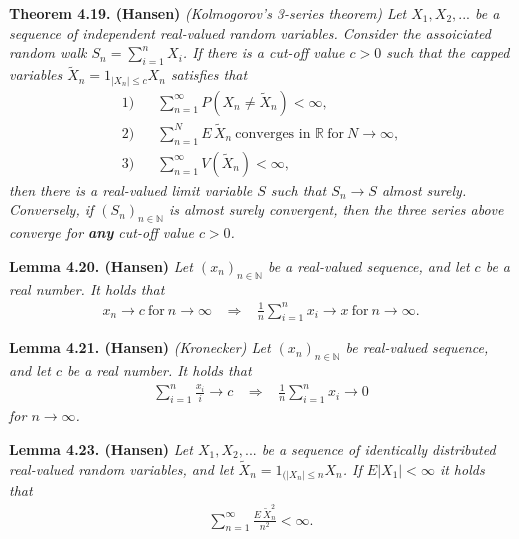 \documentclass[a4paper,12pt,openany]{book}
\begin{document}
\textbf{Theorem 4.19. (Hansen)} \emph{(Kolmogorov's 3-series theorem) Let \(X_1,X_2,...\) be a sequence of independent real-valued random variables. Consider the assoiciated random walk \(S_n=\sum_{i=1}^n X_i\). If there is a cut-off value \(c>0\) such that the capped variables \(\tilde{X}_n=1_{\vert X_n\vert \le c}X_n\) satisfies that}
\begin{align*}
    \text{1)}\hspace{10pt}& \sum_{n=1}^\infty P(X_n\ne \tilde{X}_n)<\infty,\\
    \text{2)}\hspace{10pt}& \sum_{n=1}^N E\, \tilde{X}_n\ \text{converges in }\mathbb{R}\ \text{for}\ N\to \infty,\\
    \text{3)}\hspace{10pt}& \sum_{n=1}^\infty V(\tilde{X}_n)<\infty,
\end{align*}
\emph{then there is a real-valued limit variable \(S\) such that \(S_n\to S\) almost surely.}
\emph{Conversely, if \((S_n)_{n\in\mathbb{N}}\) is almost surely convergent, then the three series above converge for \textbf{any} cut-off value \(c>0\).}

\textbf{Lemma 4.20. (Hansen)} \emph{Let \((x_n)_{n\in\mathbb{N}}\) be a real-valued sequence, and let \(c\) be a real number. It holds that}
\begin{align*}
    x_n\to c\ \text{for}\ n\to \infty \hspace{10pt}\Rightarrow\hspace{10pt} \frac{1}{n}\sum_{i=1}^nx_i\to x\ \text{for}\ n\to\infty.
\end{align*}

\textbf{Lemma 4.21. (Hansen)} \emph{(Kronecker) Let \((x_n)_{n\in\mathbb{N}}\) be real-valued sequence, and let \(c\) be a real number. It holds that}
\begin{align*}
    \sum_{i=1}^n\frac{x_i}{i}\to c \hspace{10pt}\Rightarrow\hspace{10pt} \frac{1}{n}\sum_{i=1}^nx_i\to 0
\end{align*}
\emph{for \(n\to \infty\).}

\textbf{Lemma 4.23. (Hansen)} \emph{Let \(X_1,X_2,...\) be a sequence of identically distributed real-valued random variables, and let \(\tilde{X}_n=1_{(\vert X_n\vert \le n}X_n\). If \(E\vert X_1\vert<\infty\) it holds that}
\begin{align*}
    \sum_{n=1}^\infty\frac{E\ \tilde{X}_n^2}{n^2}<\infty.
\end{align*}
\end{document}
